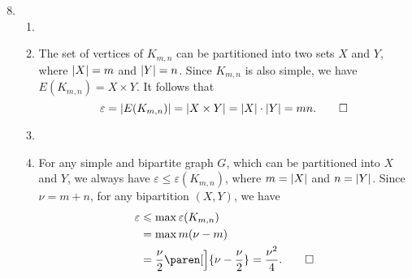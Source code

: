 \documentclass[a4paper]{book}
\makeatletter
\renewenvironment{proof}[1][\proofname]{\par
  \pushQED{\qed}%
  \normalfont \topsep6\p@\@plus6\p@\relax
  \trivlist
  \item[]\ignorespaces
}{%
  \popQED\endtrivlist\@endpefalse
}
\makeatother
\begin{document}
\begin{enumerate}
  \setcounter{enumi}{7}
\item
  \begin{enumerate}
  \item
    \begin{proof}
      The set of vertices of \(K_{m,n}\) can be partitioned into two
      sets \(X\) and \(Y\), where \(\lvert X\rvert = m\) and \(\lvert Y\rvert = n\).
      Since \(K_{m,n}\) is also simple, we have
      \(E(K_{m,n}) = X \times Y\).  It follows that
      \[
        \varepsilon = \lvert E(K_{m,n})\rvert = \lvert X \times Y\rvert = \lvert X\rvert \cdot \lvert Y\rvert = mn. \qedhere
      \]
  \end{proof}
    
  \item
    \begin{proof}
      For any simple and bipartite graph \(G\), which can be
      partitioned into \(X\) and \(Y\), we always have
      \(\varepsilon \le \varepsilon(K_{m,n})\), where \(m = \lvert X\rvert\)
      and \(n = \lvert Y\rvert\).  Since \(\nu = m+n\), for any bipartition
      \((X, Y)\), we have
      \begin{align*}
        \varepsilon &\le \max \varepsilon(K_{m,n}) \\
                    &= \max m(\nu-m) \\
                    &= \frac{\nu}{2} \paren[\Big]{\nu - \frac{\nu}{2}}
                      = \frac{\nu^2}{4}. \qedhere
      \end{align*}
    \end{proof}
  \end{enumerate}
  

\end{enumerate}
\end{document}
